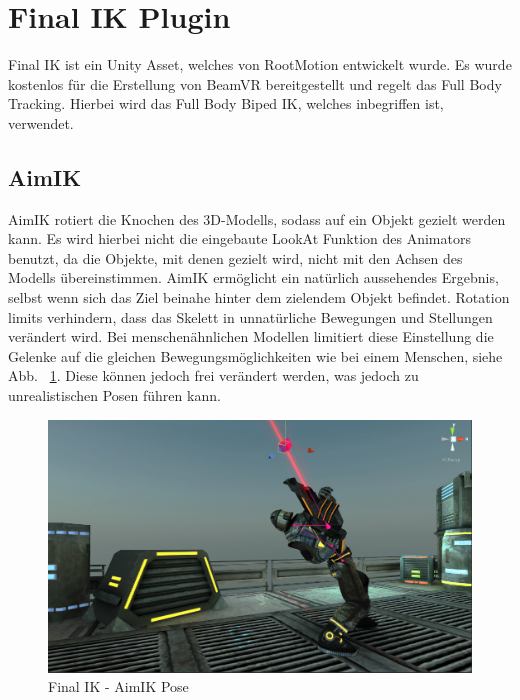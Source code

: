 \section{Final IK Plugin}\label{sec:final-ik-plugin}

Final IK ist ein Unity Asset, welches von RootMotion entwickelt wurde.
Es wurde kostenlos für die Erstellung von BeamVR bereitgestellt und regelt das Full Body Tracking.
Hierbei wird das Full Body Biped IK, welches inbegriffen ist, verwendet.
~\cite{FinalIK_Overview_2020}

\subsection{AimIK}\label{subsec:aimik}
AimIK rotiert die Knochen des 3D-Modells, sodass auf ein Objekt gezielt werden kann.
Es wird hierbei nicht die eingebaute LookAt Funktion des Animators benutzt, da die Objekte, mit denen gezielt wird, nicht mit den Achsen des Modells übereinstimmen.
AimIK ermöglicht ein natürlich aussehendes Ergebnis, selbst wenn sich das Ziel beinahe hinter dem zielendem Objekt befindet.
Rotation limits verhindern, dass das Skelett in unnatürliche Bewegungen und Stellungen verändert wird.
Bei menschenähnlichen Modellen limitiert diese Einstellung die Gelenke auf die gleichen Bewegungsmöglichkeiten wie bei einem Menschen, siehe Abb. ~\ref{fig:finalIK_aimIK_pose}.
Diese können jedoch frei verändert werden, was jedoch zu unrealistischen Posen führen kann.
\begin {figure}
    \centering
    \includegraphics[scale=0.4]{pics/finalik_aimik_pose}
    \caption{Final IK - AimIK Pose}
    \label{fig:finalIK_aimIK_pose}
\end {figure}

